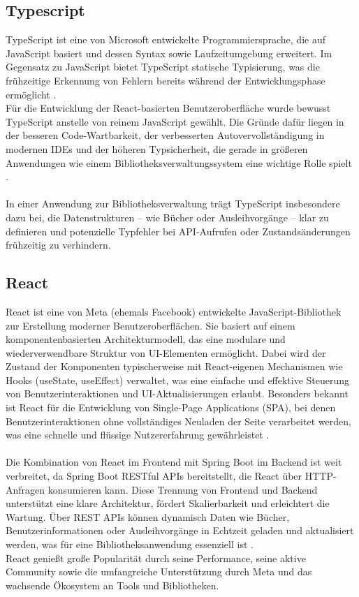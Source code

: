 \subsection{Typescript}

TypeScript ist eine von Microsoft entwickelte Programmiersprache, die auf JavaScript basiert und dessen Syntax sowie Laufzeitumgebung erweitert. Im Gegensatz zu JavaScript bietet TypeScript statische Typisierung, was die frühzeitige Erkennung von Fehlern bereits während der Entwicklungsphase ermöglicht \cite{typescriptDoc}.\\ 
Für die Entwicklung der React-basierten Benutzeroberfläche wurde bewusst TypeScript anstelle von reinem JavaScript gewählt. Die Gründe dafür liegen in der besseren Code-Wartbarkeit, der verbesserten Autovervollständigung in modernen IDEs und der höheren Typsicherheit, die gerade in größeren Anwendungen wie einem Bibliotheksverwaltungssystem eine wichtige Rolle spielt \cite{typescriptBenefits}.\\ \\
In einer Anwendung zur Bibliotheksverwaltung trägt TypeScript insbesondere dazu bei, die Datenstrukturen – wie Bücher oder Ausleihvorgänge – klar zu definieren und potenzielle Typfehler bei API-Aufrufen oder Zustandsänderungen frühzeitig zu verhindern.

\subsection{React}

React ist eine von Meta (ehemals Facebook) entwickelte JavaScript-Bibliothek zur Erstellung moderner Benutzeroberflächen. Sie basiert auf einem komponentenbasierten Architekturmodell, das eine modulare und wiederverwendbare Struktur von UI-Elementen ermöglicht. Dabei wird der Zustand der Komponenten typischerweise mit React-eigenen Mechanismen wie Hooks (useState, useEffect) verwaltet, was eine einfache und effektive Steuerung von Benutzerinteraktionen und UI-Aktualisierungen erlaubt. Besonders bekannt ist React für die Entwicklung von Single-Page Applications (SPA), bei denen Benutzerinteraktionen ohne vollständiges Neuladen der Seite verarbeitet werden, was eine schnelle und flüssige Nutzererfahrung gewährleistet \cite{react-docs, react-spa}. \\ \\
Die Kombination von React im Frontend mit Spring Boot im Backend ist weit verbreitet, da Spring Boot RESTful APIs bereitstellt, die React über HTTP-Anfragen konsumieren kann. Diese Trennung von Frontend und Backend unterstützt eine klare Architektur, fördert Skalierbarkeit und erleichtert die Wartung. Über REST APIs können dynamisch Daten wie Bücher, Benutzerinformationen oder Ausleihvorgänge in Echtzeit geladen und aktualisiert werden, was für eine Bibliotheksanwendung essenziell ist \cite{spring-rest-docs}. \\ 
React genießt große Popularität durch seine Performance, seine aktive Community sowie die umfangreiche Unterstützung durch Meta und das wachsende Ökosystem an Tools und Bibliotheken.

